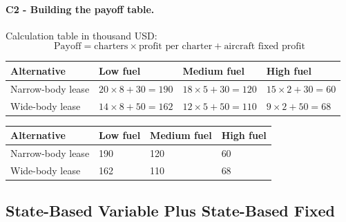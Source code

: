 
	\paragraph*{C2 - Building the payoff table.}
	\label{subsec:problem21-air-cargo-charters-c2}
	Calculation table in thousand USD:
	\[
	\text{Payoff}=\text{charters}\times\text{profit per charter}+\text{aircraft fixed profit}
	\]
	\begin{center}
		\begin{tabular}{llll}
			\toprule
			Alternative & Low fuel & Medium fuel & High fuel \\
			\midrule
			Narrow-body lease & $20 \times 8 + 30 = 190$ & $18 \times 5 + 30 = 120$ & $15 \times 2 + 30 = 60$ \\
			Wide-body lease & $14 \times 8 + 50 = 162$ & $12 \times 5 + 50 = 110$ & $9 \times 2 + 50 = 68$ \\
			\bottomrule
		\end{tabular}
	\end{center}

	\begin{center}
		\begin{tabular}{llll}
			\toprule
			Alternative & Low fuel & Medium fuel & High fuel \\
			\midrule
			Narrow-body lease & 190 & 120 & 60 \\
			Wide-body lease & 162 & 110 & 68 \\
			\bottomrule
		\end{tabular}
	\end{center}


	\subsection{State-Based Variable Plus State-Based Fixed}
	\label{sec:state-based-variable-payoff-plus-state-based-fixed-payoff}


